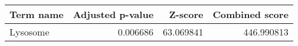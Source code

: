 \begin{tabular}{lrrr}
\toprule
Term name &  Adjusted p-value &   Z-score &  Combined score \\
\midrule
 Lysosome &          0.006686 & 63.069841 &      446.990813 \\
\bottomrule
\end{tabular}

